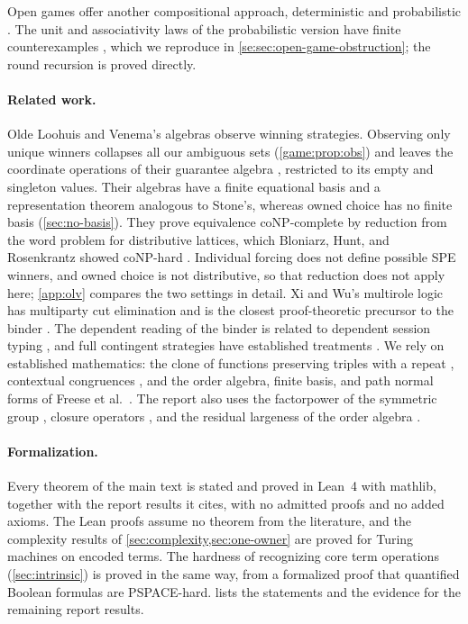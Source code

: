 Open games offer another compositional approach, deterministic \cite{GhaniEtAl2018} and probabilistic \cite{GhaniEtAl2020}. The unit and associativity laws of the probabilistic version have finite counterexamples \cite{GameTheoryOpenGameObstructions2026}, which we reproduce in \cref{se:sec:open-game-obstruction}; the round recursion is proved directly.

\paragraph{Related work.}
Olde Loohuis and Venema's algebras observe winning strategies. Observing only unique winners collapses all our ambiguous sets (\cref{game:prop:obs}) and leaves the coordinate operations of their guarantee algebra \cite[Definition~3.20]{OldeLoohuisVenema2010}, restricted to its empty and singleton values. Their algebras have a finite equational basis and a representation theorem analogous to Stone's, whereas owned choice has no finite basis (\cref{sec:no-basis}). They prove equivalence coNP-complete \cite[Theorem~5.50]{OldeLoohuisVenema2010} by reduction from the word problem for distributive lattices, which Bloniarz, Hunt, and Rosenkrantz showed coNP-hard \cite{BloniarzHuntRosenkrantz1984}. Individual forcing does not define possible SPE winners, and owned choice is not distributive, so that reduction does not apply here; \cref{app:olv} compares the two settings in detail. Xi and Wu's multirole logic has multiparty cut elimination and is the closest proof-theoretic precursor to the binder
\cite{XiWu2023}. The dependent reading of the binder is related to dependent session typing \cite{ToninhoYoshida2017,WuXi2018,ToninhoCairesPfenning2011}, and full contingent strategies have established treatments \cite{Rubinstein1991,EscardoOliva2023}. We rely on established mathematics: the clone of functions preserving triples with a repeat \cite{Szendrei2012}, contextual congruences \cite{BlokPigozzi1989,Font1993}, and the order algebra, finite basis, and path normal forms of Freese et al.\ \cite{FreeseEtAl2002}. The report also uses the factorpower of the symmetric group \cite{GanyushkinMazorchuk1995,Mazorchuk2009}, closure operators \cite{Crapo1967}, and the residual largeness of the order algebra \cite{FreeseEtAl2002}.

\paragraph{Formalization.}
Every theorem of the main text is stated and proved in Lean~4 with mathlib, together with the report results it cites, with no admitted proofs and no added axioms. The Lean proofs assume no theorem from the literature, and the complexity results of \cref{sec:complexity,sec:one-owner} are proved for Turing machines on encoded terms. The hardness of recognizing core term operations (\cref{sec:intrinsic}) is proved in the same way, from a formalized proof that quantified Boolean formulas are PSPACE-hard.  lists the statements and the evidence for the remaining report results.

